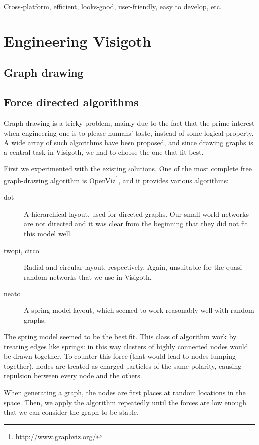 \documentclass[a4paper,11pt,titlepage]{article}
\let\stdsection\section         %
\renewcommand{\section}{\newpage\stdsection}
\begin{document}
Cross-platform, efficient, looks-good, user-friendly, easy to develop,
etc.

\section{Engineering Visigoth}

\subsection{Graph drawing}

\subsection{Force directed algorithms}
Graph drawing is a tricky problem, mainly due to the fact that the
prime interest when engineering one is to please humans' taste,
instead of some logical property. A wide array of such algorithms have
been proposed, and since drawing graphs is a central task in Visigoth,
we had to choose the one that fit best.

First we experimented with the existing solutions. One of the most
complete free graph-drawing algorithm is
OpenViz\footnote{\url{http://www.graphviz.org/}}, and it provides
various algorithms:

\begin{description}
\item [dot] A hierarchical layout, used for directed graphs. Our small
  world networks are not directed and it was clear from the beginning
  that they did not fit this model well.

\item [twopi, circo] Radial and circular layout, respectively. Again,
  unsuitable for the quasi-random networks that we use in Visigoth.

\item [neato] A spring model layout, which seemed to work reasonably
  well with random graphs.
\end{description}

The spring model seemed to be the best fit. This class of algorithm
work by treating edges like springs: in this way clusters of highly
connected nodes would be drawn together. To counter this force (that
would lead to nodes lumping together), nodes are treated as charged
particles of the same polarity, causing repulsion between every node
and the others.

When generating a graph, the nodes are first places at random
locations in the space. Then, we apply the algorithm repeatedly until
the forces are low enough that we can consider the graph to be stable.
\end{document}
